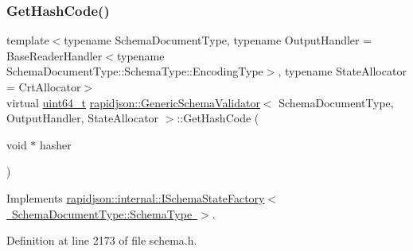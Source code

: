 \subsubsection{\texorpdfstring{GetHashCode()}{GetHashCode()}}
{\footnotesize\ttfamily template$<$typename Schema\+Document\+Type, typename Output\+Handler = Base\+Reader\+Handler$<$typename Schema\+Document\+Type\+::\+Schema\+Type\+::\+Encoding\+Type$>$, typename State\+Allocator = Crt\+Allocator$>$ \\
virtual \mbox{\hyperlink{stdint_8h_aec6fcb673ff035718c238c8c9d544c47}{uint64\+\_\+t}} \mbox{\hyperlink{classrapidjson_1_1_generic_schema_validator}{rapidjson\+::\+Generic\+Schema\+Validator}}$<$ Schema\+Document\+Type, Output\+Handler, State\+Allocator $>$\+::Get\+Hash\+Code (\begin{DoxyParamCaption}\item[{void $\ast$}]{hasher }\end{DoxyParamCaption})\hspace{0.3cm}{\ttfamily [virtual]}}



Implements \mbox{\hyperlink{classrapidjson_1_1internal_1_1_i_schema_state_factory_afc18fb7b00f13e9fe4505b75e0a23d5d}{rapidjson\+::internal\+::\+I\+Schema\+State\+Factory$<$ Schema\+Document\+Type\+::\+Schema\+Type $>$}}.



Definition at line 2173 of file schema.\+h.


\begin{DoxyCode}{0}

\end{DoxyCode}
\mbox{\label{classrapidjson_1_1_generic_schema_validator_a74b9af7a9d3892fe5d299ec9bda8a78e}} 
